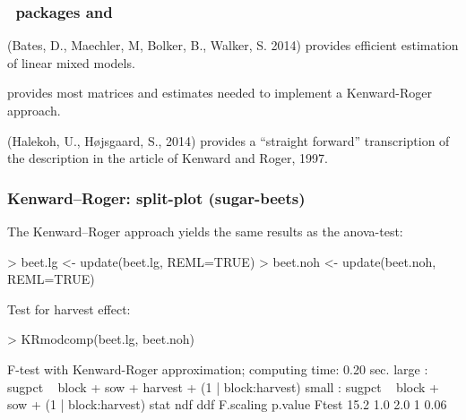 \begin{sframe}
  \frametitle{{\R\ packages } and }

   (Bates, D., Maechler, M,  Bolker, B., Walker, S. 2014)
provides efficient estimation of linear mixed models.

 provides most  matrices and estimates needed 
to  implement a Kenward-Roger approach.

 (Halekoh, U.,   H{\o}jsgaard, S., 2014)
provides a ``straight forward'' transcription of the
description in the article of Kenward and Roger,  1997.

\end{sframe}

 




\begin{sframe}
  \frametitle{Kenward--Roger: split-plot (sugar-beets)}
The Kenward--Roger approach yields the same results
as the anova-test:

\begin{Schunk}
\begin{Sinput}
> beet.lg <- update(beet.lg, REML=TRUE)
> beet.noh <- update(beet.noh, REML=TRUE)
\end{Sinput}
\end{Schunk}
Test for harvest effect:
\begin{Schunk}
\begin{Sinput}
> KRmodcomp(beet.lg, beet.noh)
\end{Sinput}
\begin{Soutput}
F-test with Kenward-Roger approximation; computing time: 0.20 sec.
large : sugpct ~ block + sow + harvest + (1 | block:harvest)
small : sugpct ~ block + sow + (1 | block:harvest)
      stat  ndf  ddf F.scaling p.value
Ftest 15.2  1.0  2.0         1    0.06
\end{Soutput}
\end{Schunk}
\end{sframe}



